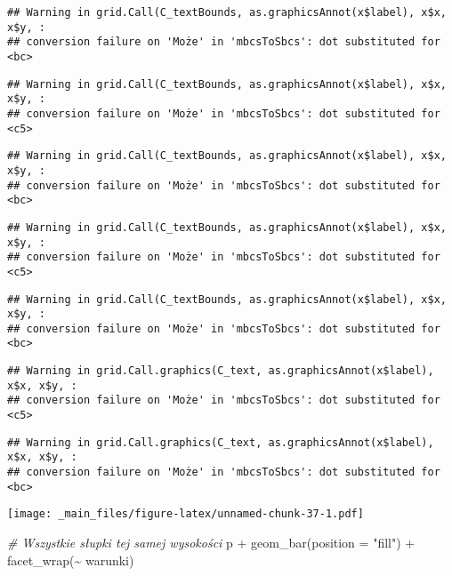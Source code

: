 \documentclass[
]{book}
\newenvironment{Shaded}{\begin{snugshade}}{\end{snugshade}}
\newcommand{\AttributeTok}[1]{\textcolor[rgb]{0.77,0.63,0.00}{#1}}
\newcommand{\CommentTok}[1]{\textcolor[rgb]{0.56,0.35,0.01}{\textit{#1}}}
\newcommand{\FunctionTok}[1]{\textcolor[rgb]{0.00,0.00,0.00}{#1}}
\newcommand{\NormalTok}[1]{#1}
\newcommand{\SpecialCharTok}[1]{\textcolor[rgb]{0.00,0.00,0.00}{#1}}
\newcommand{\StringTok}[1]{\textcolor[rgb]{0.31,0.60,0.02}{#1}}
\begin{document}
\begin{verbatim}
## Warning in grid.Call(C_textBounds, as.graphicsAnnot(x$label), x$x, x$y, :
## conversion failure on 'Może' in 'mbcsToSbcs': dot substituted for <bc>
\end{verbatim}

\begin{verbatim}
## Warning in grid.Call(C_textBounds, as.graphicsAnnot(x$label), x$x, x$y, :
## conversion failure on 'Może' in 'mbcsToSbcs': dot substituted for <c5>
\end{verbatim}

\begin{verbatim}
## Warning in grid.Call(C_textBounds, as.graphicsAnnot(x$label), x$x, x$y, :
## conversion failure on 'Może' in 'mbcsToSbcs': dot substituted for <bc>
\end{verbatim}

\begin{verbatim}
## Warning in grid.Call(C_textBounds, as.graphicsAnnot(x$label), x$x, x$y, :
## conversion failure on 'Może' in 'mbcsToSbcs': dot substituted for <c5>
\end{verbatim}

\begin{verbatim}
## Warning in grid.Call(C_textBounds, as.graphicsAnnot(x$label), x$x, x$y, :
## conversion failure on 'Może' in 'mbcsToSbcs': dot substituted for <bc>
\end{verbatim}

\begin{verbatim}
## Warning in grid.Call.graphics(C_text, as.graphicsAnnot(x$label), x$x, x$y, :
## conversion failure on 'Może' in 'mbcsToSbcs': dot substituted for <c5>
\end{verbatim}

\begin{verbatim}
## Warning in grid.Call.graphics(C_text, as.graphicsAnnot(x$label), x$x, x$y, :
## conversion failure on 'Może' in 'mbcsToSbcs': dot substituted for <bc>
\end{verbatim}

\texttt{[image: \_main\_files/figure-latex/unnamed-chunk-37-1.pdf]}

\begin{Shaded}
\begin{Highlighting}[]
\CommentTok{\# Wszystkie słupki tej samej wysokości}
\NormalTok{p }\SpecialCharTok{+} \FunctionTok{geom\_bar}\NormalTok{(}\AttributeTok{position =} \StringTok{"fill"}\NormalTok{) }\SpecialCharTok{+} \FunctionTok{facet\_wrap}\NormalTok{(}\SpecialCharTok{\textasciitilde{}}\NormalTok{ warunki)}
\end{Highlighting}
\end{Shaded}
\end{document}
